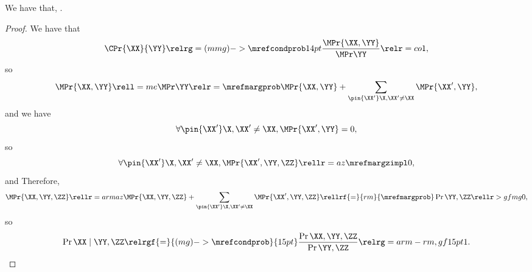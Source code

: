 \begin{proposition}
  We have that, \ponecindprop.%
\end{proposition}

\begin{proof}
  We have that 
  $$\CPr{\XX}{\YY} \relrg = (mmg)->{\mrefcondprob} 14pt \frac{\MPr{\XX, \YY}}{\MPr\YY} \relr = co 1,$$
  so 
  \def\notx{\pin{\XX'}\X, \XX' \ne \XX}
  $$\MPr{\XX, \YY} \rell = me \MPr\YY \relr = {\mrefmargprob} \MPr{\XX, \YY} + \sum_{\notx}\MPr{\XX', \YY},$$
  and we have
  $$\forall \notx, \MPr{\XX',\YY} = 0,$$
  so
  $$\forall \notx, \MPr{\XX',\YY,\ZZ} \rellr = az {\mrefmargzimpl} 0,$$
  and
  Therefore, $$\MPr{\XX,\YY,\ZZ} \rellr = arm az \MPr{\XX,\YY,\ZZ} + \sum_{\notx}\MPr{\XX',\YY,\ZZ}
  \rellrf{=}{rm}{\mrefmargprob} \Pr{\YY, \ZZ} \rellr > gf mg 0,$$
  so $$\Pr{\XX \mid \YY, \ZZ} 
  \relrgf{=}{(mg)->\mrefcondprob}{15pt} \frac{\Pr{\XX, \YY, \ZZ}}{\Pr{\YY, \ZZ}} 
  \relrg = arm-rm,gf 15pt 1.$$%
\end{proof}
